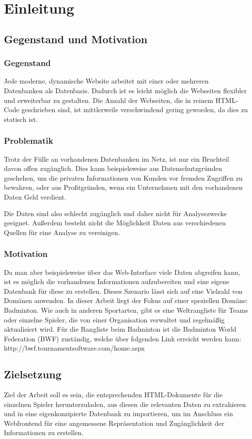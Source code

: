\chapter{Einleitung}
\section{Gegenstand und Motivation}
\subsection{Gegenstand}
Jede moderne, dynamische Website arbeitet mit einer oder mehreren Datenbanken als Datenbasis. Dadurch ist es leicht möglich die Webseiten flexibler und erweiterbar zu gestalten. Die Anzahl der Webseiten, die in reinem HTML-Code geschrieben sind, ist mittlerweile verschwindend gering geworden, da dies zu statisch ist. 

\subsection{Problematik}
Trotz der Fülle an vorhandenen Datenbanken im Netz, ist nur ein Bruchteil davon offen zugänglich. Dies kann beispielsweise aus Datenschutzgründen geschehen, um die privaten Informationen von Kunden vor fremden Zugriffen zu bewahren, oder aus Profitgründen, wenn ein Unternehmen mit den vorhandenen Daten Geld verdient. 

Die Daten sind also schlecht zugänglich und daher nicht für Analysezwecke geeignet. Außerdem besteht nicht die Möglichkeit Daten aus verschiedenen Quellen für eine Analyse zu vereinigen. 

\subsection{Motivation}
Da man aber beispielsweise über das Web-Interface viele Daten abgreifen kann, ist es möglich die vorhandenen Informationen aufzubereiten und eine eigene Datenbank für diese zu erstellen. Dieses Szenario lässt sich auf eine Vielzahl von Domänen anwenden. In dieser Arbeit liegt der Fokus auf einer speziellen Domäne: Badminton. Wie auch in anderen Sportarten, gibt es eine Weltrangliste für Teams oder einzelne Spieler, die von einer Organisation verwaltet und regelmäßig aktualisiert wird. Für die Rangliste beim Badminton ist die Badminton World Federation (BWF) zuständig, welche über folgenden Link erreicht werden kann: http://bwf.tournamentsoftware.com/home.aspx \cite{BWF2015}

\section{Zielsetzung}
Ziel der Arbeit soll es sein, die entsprechenden HTML-Dokumente für die einzelnen Spieler herunterzuladen, aus diesen die relevanten Daten zu extrahieren und in eine eigenkonzipierte Datenbank zu importieren, um im Anschluss ein Webfrontend für eine angemessene Repräsentation und Zugänglichkeit der Informationen zu erstellen.